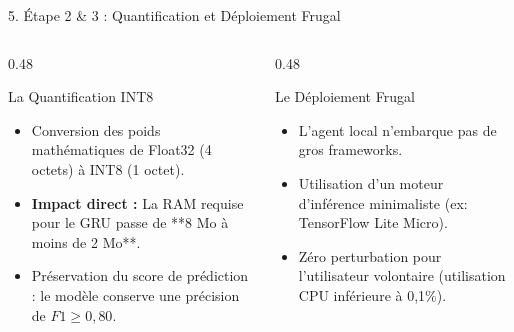 \documentclass[10pt,aspectratio=169]{beamer}
\begin{document}
\begin{frame}{5. Étape 2 \& 3 : Quantification et Déploiement Frugal}
  \begin{columns}[T]
    \begin{column}{0.48\textwidth}
      \begin{block}{La Quantification INT8}
        \begin{itemize}
          \item Conversion des poids mathématiques de Float32 (4 octets) à INT8 (1 octet).
          \item \textbf{Impact direct :} La RAM requise pour le GRU passe de **8 Mo à moins de 2 Mo**.
          \item Préservation du score de prédiction : le modèle conserve une précision de $F1 \ge 0,80$.
        \end{itemize}
      \end{block}
    \end{column}
    
    \begin{column}{0.48\textwidth}
      \begin{block}{Le Déploiement Frugal}
        \begin{itemize}
          \item L'agent local n'embarque pas de gros frameworks.
          \item Utilisation d'un moteur d'inférence minimaliste (ex: TensorFlow Lite Micro).
          \item Zéro perturbation pour l'utilisateur volontaire (utilisation CPU inférieure à 0,1\%).
        \end{itemize}
      \end{block}
    \end{column}
  \end{columns}
\end{frame}
\end{document}
